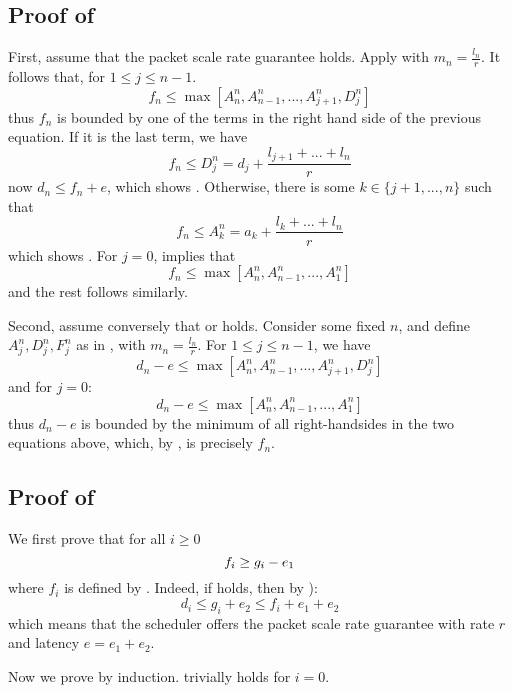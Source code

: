 \subsection{Proof of } First, assume that the packet scale
rate guarantee holds. Apply  with
$m_n=\frac{l_n}{r}$. It follows that, for $1\leq j\leq n-1$.
$$
f_n \leq \max\left[ A_n^n , A_{n-1}^n , ... , A_{j+1}^n ,
D_j^n \right]
$$
thus $f_n$ is bounded by one of the terms in the right hand
side of the previous equation. If it is the last term, we have
$$
f_n \leq D_j^n= d_j + \frac{l_{j+1} + ... + l_n}{r}
$$
now $d_n \leq f_n + e$, which shows .
Otherwise, there is some $k \in \{j+1, ..., n\}$ such that
$$
f_n \leq A_{k}^n =  a_k + \frac{l_k + ... + l_n}{r}
$$ which shows .
For $j=0$,  implies that
$$
f_n \leq \max\left[A_n^n , A_{n-1}^n, ... , A_1^n \right]
$$ and the rest follows similarly.

Second, assume conversely that  or
 holds. Consider some fixed $n$, and
define $A_j^n, D_j^n, F_j^n$ as in ,
with $m_n=\frac{l_n}{r}$. For $1 \leq j\leq n-1$, we have
$$
d_n -e \leq \max\left[ A_n^n , A_{n-1}^n , ... , A_{j+1}^n ,
D_j^n \right]
$$
and for $j=0$:
 $$
d_n -e \leq \max\left[A_n^n , A_{n-1}^n , ... , A_1^n\right]
 $$
thus $d_n -e$ is bounded by the minimum of all right-handsides
in the two equations above, which, by  ,
is precisely $f_n$.

\subsection{Proof of
} We first prove that for all $i \geq 0$
\begin{equation}\mylabel{eq-asc-c2}
  f_i \geq g_i - e_1
\end{equation}
where $f_i$ is  defined by . Indeed, if
 holds, then by ):
$$
d_{i}  \leq g_i + e_2 \leq f_i + e_1 + e_2 $$ which means that
the scheduler offers the packet scale rate guarantee with rate
$r$ and latency $e= e_1 + e_2$.

Now we prove  by induction. 
trivially holds for $i=0$.

